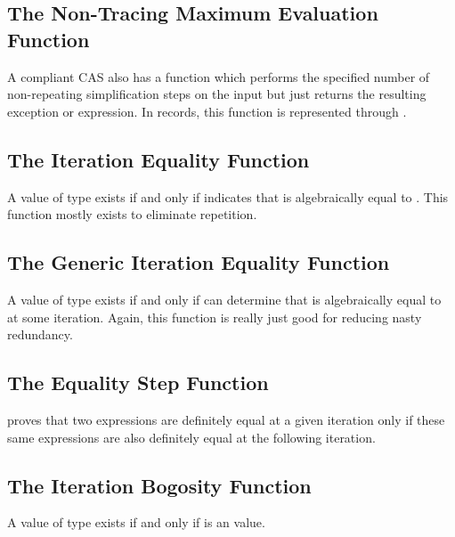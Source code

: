 \documentclass{report}
\begin{document}
\subsection{The Non-Tracing Maximum Evaluation Function}
A compliant CAS also has a function which performs the specified number of non-repeating simplification steps on the input but just returns the resulting exception or expression.  In  records, this function is represented through .

\subsection{The Iteration Equality Function}
A value of type      exists if and only if      indicates that  is algebraically equal to .  This function mostly exists to eliminate repetition.

\subsection{The Generic Iteration Equality Function}
A value of type     exists if and only if   can determine that  is algebraically equal to  at some iteration.  Again, this function is really just good for reducing nasty redundancy.

\subsection{The Equality Step Function}
 proves that two expressions are definitely equal at a given iteration only if these same expressions are also definitely equal at the following iteration.

\subsection{The Iteration Bogosity Function}
A value of type     exists if and only if     is an  value.
\end{document}
